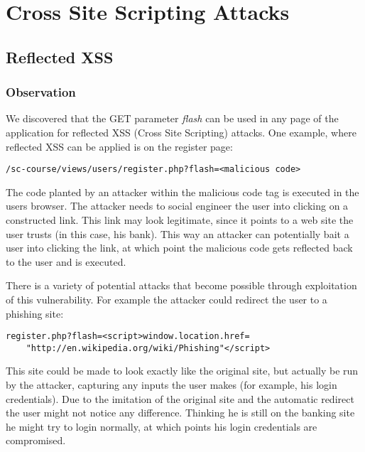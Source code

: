 \chapter{Cross Site Scripting Attacks}

\section{Reflected XSS}

\subsection{Observation}
We discovered that the GET parameter \emph{flash} can be used in any page of the application for reflected XSS (Cross Site Scripting) attacks. One example, where reflected XSS can be applied is on the register page:
\begin{verbatim}
/sc-course/views/users/register.php?flash=<malicious code>
\end{verbatim}
The code planted by an attacker within the malicious code tag is executed in the users browser. The attacker needs to social engineer the user into clicking on a constructed link. This link may look legitimate, since it points to a web site the user trusts (in this case, his bank). This way an attacker can potentially bait a user into clicking the link, at which point the malicious code gets reflected back to the user and is executed. 

There is a variety of potential attacks that become possible through exploitation of this vulnerability. For example the attacker could redirect the user to a phishing site:
\begin{lstlisting}[caption= Automatic Redirect to Phishing Site,label=listing:first_test]
register.php?flash=<script>window.location.href=
    "http://en.wikipedia.org/wiki/Phishing"</script>
\end{lstlisting}
This site could be made to look exactly like the original site, but actually be run by the attacker, capturing any inputs the user makes (for example, his login credentials). Due to the imitation of the original site and the automatic redirect the user might not notice any difference. Thinking he is still on the banking site he might try to login normally, at which points his login credentials are compromised.

